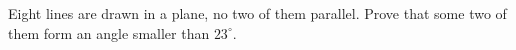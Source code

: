 Eight lines are drawn in a plane, no two of them parallel. Prove that some two of them form an angle smaller than $23^\circ$.

